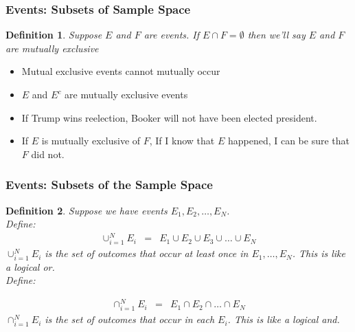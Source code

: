 \documentclass{beamer}
\newtheorem{defn}{Definition}
\numberwithin{equation}{section}
\begin{document}
\begin{frame}
\frametitle{Events: Subsets of Sample Space}

\begin{defn}
Suppose $E$ and $F$ are events.  If $E \cap F = \emptyset$ then we'll say $E$ and $F$ are \alert{mutually exclusive}
\end{defn}

\pause 

\begin{itemize}
\item[-] Mutual exclusive events cannot mutually occur \pause 
\item[-] $E$ and $E^{c}$ are mutually exclusive events \pause 
\end{itemize}

\begin{itemize}
\item[-] If Trump wins reelection, Booker will not have been elected president. \pause 
\item[-] If $E$ is mutually exclusive of $F$, If I know that $E$ happened, I can be sure that $F$ did not.
\end{itemize}


\end{frame}



\begin{frame}
\frametitle{Events: Subsets of the Sample Space}

\begin{defn}
Suppose we have events $E_{1}, E_{2}, \hdots, E_{N}$.  \\
Define: 
\begin{eqnarray}
\cup_{i=1}^{N} E_{i} & = & E_{1} \cup E_{2} \cup E_{3} \cup \hdots \cup E_{N} \nonumber
\end{eqnarray}
 $\cup_{i=1}^{N} E_{i} $ is the set of outcomes that occur at least once in $E_{1} , \hdots, E_{N}$.  This is like a logical or. \pause \\


Define: 


\begin{eqnarray}
\cap_{i=1}^{N} E_{i} & = & E_{1} \cap E_{2} \cap \hdots \cap E_{N} \nonumber 
\end{eqnarray}
$\cap_{i=1}^{N} E_{i} $ is the set of outcomes that occur in each $E_{i}$.  This is like a logical and.


\end{defn}


\end{frame}
\end{document}
